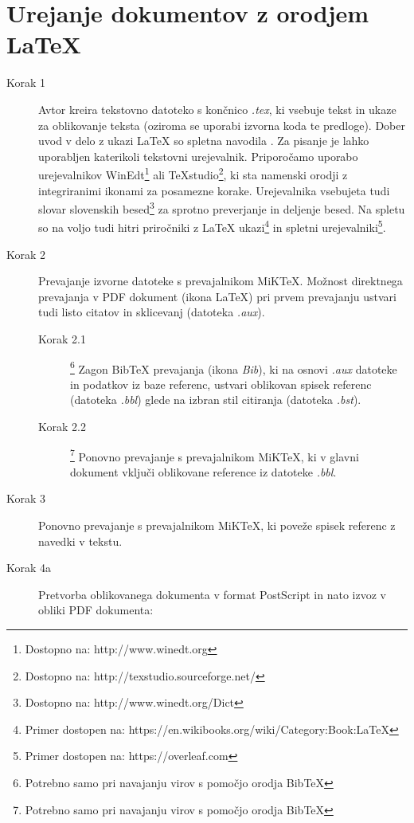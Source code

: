 \appendix

\chapter{Urejanje dokumentov z orodjem LaTeX} \label{prilogaA}

\begin{description}
	\item[Korak 1] Avtor kreira tekstovno datoteko s končnico \emph{.tex}, ki vsebuje tekst in ukaze za oblikovanje teksta (oziroma se uporabi izvorna koda te predloge). Dober uvod v delo z ukazi LaTeX so spletna navodila \cite{oetiker1995not}. Za pisanje je lahko uporabljen katerikoli tekstovni urejevalnik. Priporočamo uporabo urejevalnikov WinEdt\footnote{Dostopno na: http://www.winedt.org} ali TeXstudio\footnote{Dostopno na: http://texstudio.sourceforge.net/}, ki sta namenski orodji z integriranimi ikonami za posamezne korake. Urejevalnika vsebujeta tudi slovar slovenskih besed\footnote{Dostopno na: http://www.winedt.org/Dict} za sprotno preverjanje in deljenje besed. Na spletu so na voljo tudi hitri priročniki z LaTeX ukazi\footnote{Primer dostopen na: https://en.wikibooks.org/wiki/Category:Book:LaTeX} in spletni urejevalniki\footnote{Primer dostopen na: https://overleaf.com}.
	\item[Korak 2] Prevajanje izvorne datoteke s prevajalnikom MiKTeX. Možnost direktnega prevajanja v PDF dokument (ikona LaTeX) pri prvem prevajanju ustvari tudi listo citatov in sklicevanj (datoteka \emph{.aux}).
	\begin{description}
		\item[Korak 2.1]\footnote{Potrebno samo pri navajanju virov s pomočjo orodja BibTeX} Zagon BibTeX prevajanja (ikona \emph{Bib}), ki na osnovi \emph{.aux} datoteke in podatkov iz baze referenc, ustvari oblikovan spisek referenc (datoteka \emph{.bbl}) glede na izbran stil citiranja (datoteka \emph{.bst}).
		\item[Korak 2.2]\footnote{Potrebno samo pri navajanju virov s pomočjo orodja BibTeX} Ponovno prevajanje s prevajalnikom MiKTeX, ki v glavni dokument vključi oblikovane reference iz datoteke \emph{.bbl}.
	\end{description}
	\item[Korak 3] Ponovno prevajanje s prevajalnikom MiKTeX, ki poveže spisek referenc z navedki v tekstu.
	\item[Korak 4a] Pretvorba oblikovanega dokumenta v format PostScript in nato izvoz v obliki PDF dokumenta:

\end{description}
